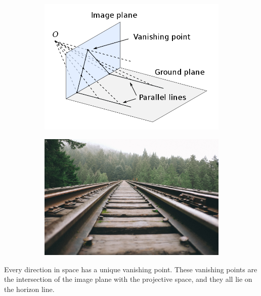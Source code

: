 \begin{figure}[ht!]
    \centering

    \begin{subfigure}{0.45\linewidth}
        \includegraphics[width=\linewidth]{figures/640px-Vanishing_point.svg.png}
    \end{subfigure}
    \hfil%
    \begin{subfigure}{0.45\linewidth}
        \includegraphics[width=\linewidth]{figures/nature-forest-track-railway-railroad-bridge-734310-pxhere.com.jpg}
    \end{subfigure}

\end{figure}

Every direction in space has a unique vanishing point. These vanishing points are the intersection of the image plane with the projective space, and they all lie on the horizon line.